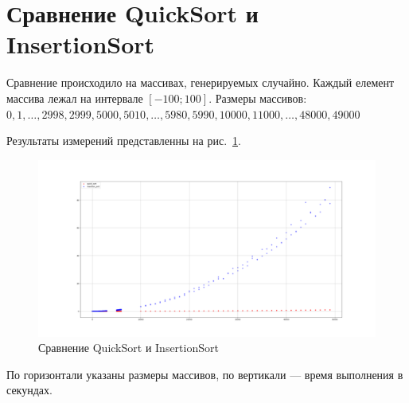 \section*{Сравнение QuickSort и InsertionSort}

Сравнение происходило на массивах, генерируемых случайно.
Каждый елемент массива лежал на интервале $ [-100; 100] $.
Размеры массивов:
$ 0, 1, \dots, 2998, 2999, 5000, 5010, \dots, 5980, 5990, 10000, 11000, \dots, 48000, 49000 $

Результаты измерений представленны на рис.~\ref{fig:cmp_plot}.

\begin{figure}[H]
    \centering
    \includegraphics[width=\linewidth]{photo/cmp_plot}
    \caption{Сравнение QuickSort и InsertionSort}
    \label{fig:cmp_plot}
\end{figure}

По горизонтали указаны размеры массивов, по вертикали --- время выполнения в секундах.